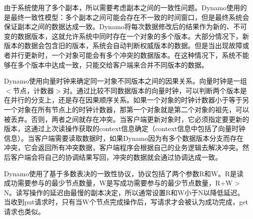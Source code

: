 \documentclass[UTF8]{article}
\begin{document}
		由于系统使用了多个副本，所以需要考虑副本之间的一致性问题。Dynamo使用的是最终一致性模型：多个副本之间可能会存在不一致的时间窗口，但是最终系统会保证副本之间的数据达成一致。Dynamo将每次数据修改后的结果作为新的、不可变的数据版本，这就允许系统中同时存在一个对象的多个版本。大部分情况下，新版本的数据会包含旧的版本，系统会自动判断权威版本的数据。但是当出现故障或者并行更新时，一个对象可能会有多个冲突的数据版本。在这种情况下，系统不能够在多个版本中达成一致，只能交给客户端来合并不同版本的数据。

		Dynamo使用向量时钟来确定同一对象不同版本之间的因果关系。向量时钟是一组$<$节点，计数器$>$对。通过比较不同数据版本的向量时钟，可以判断两个版本是在并行的分支上，还是存在因果顺序关系。如果一个对象的时钟计数器小于等于另一个对象在所有节点上的时钟计数器，那第一个对象就是第二个对象的祖先，可以被丢弃。否则，两者之间就存在冲突。当客户端更新对象时，它必须指定要更新的版本，这通过上次读操作获取的context信息确定（context信息中包括了向量时钟信息）。当客户端需要读取数据时，如果Dynamo因为有多个数据版本分支而存在冲突，它会返回所有冲突数据，客户端程序会根据自己的业务逻辑去解决冲突。然后客户端会将自己的协调结果写回，冲突的数据就会通过协调达成一致。

		Dynamo使用了基于多数表决的一致性协议，协议包括了两个参数R和W。R是读成功需要参与的最少节点数量，W是写成功需要参与的最少节点数量，R+W$>$N。读写操作的延迟由最慢的副本决定，所以通常设置R和W小于N以降低延迟。当收到put请求时，只有当W个节点完成操作后，写请求才会被认为成功完成，get请求也类似。

\end{document}
